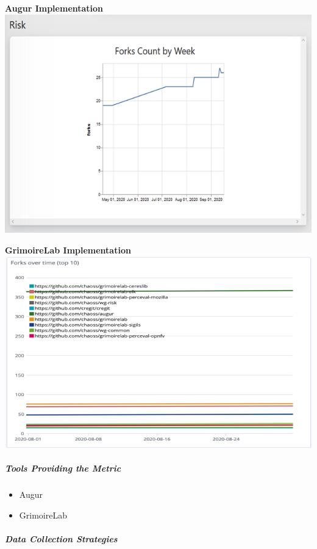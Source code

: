 \textbf{Augur Implementation}\\
\includegraphics{images/technical-fork_augur-fork.png}

\textbf{GrimoireLab Implementation}\\
\includegraphics{images/technical-fork_grimoirelab-fork.png}

\hypertarget{tools-providing-the-metric}{%
\subparagraph{Tools Providing the
Metric}\label{tools-providing-the-metric}}

\begin{itemize}
\tightlist
\item
  Augur
\item
  GrimoireLab
\end{itemize}

\hypertarget{data-collection-strategies}{%
\subparagraph{Data Collection
Strategies}\label{data-collection-strategies}}

